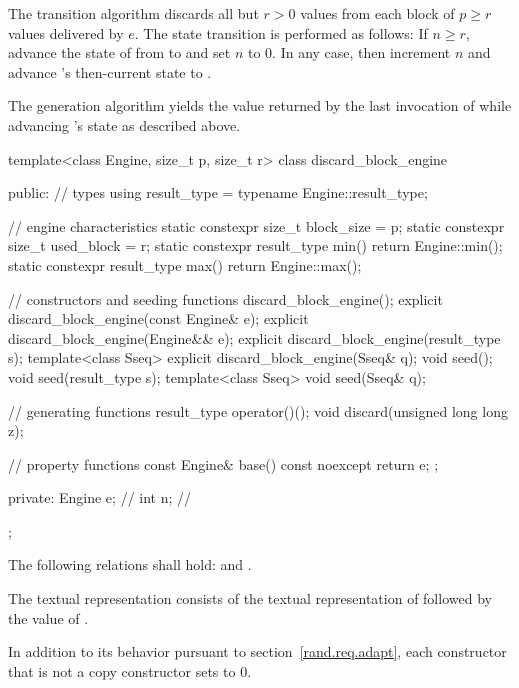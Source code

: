 \pnum
The transition algorithm%
%
discards all but $r > 0$ values
from each block of $p \geq r$ values delivered by $e$.
The state transition is performed as follows:
If $n \geq r$,
 advance the state of  from  to 
 and set $n$ to $0$.
In any case,
 then increment $n$
 and advance 's then-current state 
 to .

\pnum
The generation algorithm%
%
yields the value returned by the last invocation of 
 while advancing 's state as described above.

\begin{codeblock}
template<class Engine, size_t p, size_t r>
 class discard_block_engine
{
public:
 // types
 using result_type = typename Engine::result_type;

 // engine characteristics
 static constexpr size_t block_size = p;
 static constexpr size_t used_block = r;
 static constexpr result_type min() { return Engine::min(); }
 static constexpr result_type max() { return Engine::max(); }

 // constructors and seeding functions
 discard_block_engine();
 explicit discard_block_engine(const Engine& e);
 explicit discard_block_engine(Engine&& e);
 explicit discard_block_engine(result_type s);
 template<class Sseq> explicit discard_block_engine(Sseq& q);
 void seed();
 void seed(result_type s);
 template<class Sseq> void seed(Sseq& q);

 // generating functions
 result_type operator()();
 void discard(unsigned long long z);

 // property functions
 const Engine& base() const noexcept { return e; };

private:
 Engine e;   // \expos
 int n;      // \expos
};
\end{codeblock}

\pnum
The following relations shall hold:
and
  .

\pnum
The textual representation%
%
consists of
 the textual representation of 
followed by
 the value of .

\pnum
In addition to its behavior
pursuant to section~\ref{rand.req.adapt},
each constructor%
that is not a copy constructor
sets  to $0$.

